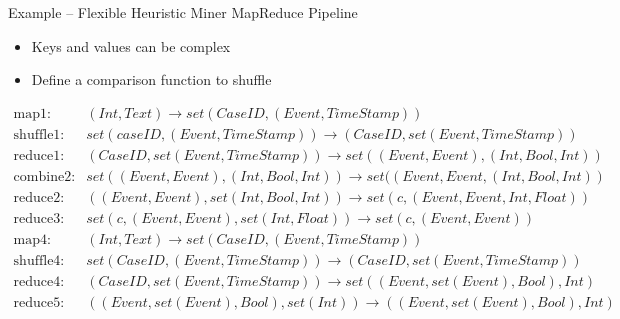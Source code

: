 \documentclass[ignorenonframetext,xcolor=x11names]{beamer}
\begin{document}
\begin{frame}[label=full]{Example -- Flexible Heuristic Miner MapReduce Pipeline}

\begin{itemize}
\item Keys and values can be complex
\item Define a comparison function to shuffle
\end{itemize}
\footnotesize
\begin{align*}
\text{map1:} &(Int, Text) \rightarrow set(CaseID, (Event, TimeStamp)) \\
\text{shuffle1:} &set(caseID, (Event, TimeStamp)) \rightarrow (CaseID, set(Event, TimeStamp)) \\
\text{reduce1:}  &(CaseID, set(Event, TimeStamp)) \rightarrow set((Event, Event), (Int, Bool, Int)) \\
\text{combine2:} &set((Event, Event), (Int, Bool, Int)) \rightarrow set((Event, Event, (Int, Bool, Int)) \\
\text{reduce2:}   &((Event, Event), set(Int, Bool, Int)) \rightarrow set(c, (Event, Event, Int, Float)) \\
\text{reduce3:}  & set(c, (Event, Event), set(Int, Float)) \rightarrow set(c, (Event, Event)) \\
\text{map4:}     & (Int, Text) \rightarrow set(CaseID, (Event, TimeStamp)) \\
\text{shuffle4:} & set(CaseID, (Event, TimeStamp)) \rightarrow (CaseID, set(Event, TimeStamp)) \\
\text{reduce4:}  & (CaseID, set(Event, TimeStamp)) \rightarrow set((Event, set(Event), Bool), Int) \\
\text{reduce5:}  & ((Event, set(Event), Bool), set(Int)) \rightarrow ((Event, set(Event), Bool), Int) 
\end{align*}
\end{frame}
\end{document}
